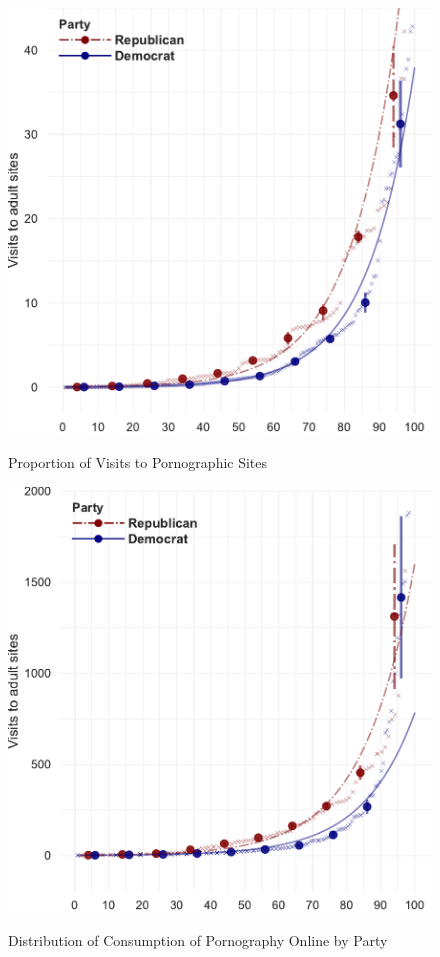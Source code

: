 \documentclass[12pt, letterpaper]{article}
\begin{document}
\begin{figure}[h]
\centering
\caption{Proportion of Visits to Pornographic Sites}
\includegraphics[scale=.75]{../figs/distribution_proportion_adultsites_visits_by_party.pdf}
\label{fig:distribution_prop_visits}
\end{figure}

\begin{figure}[h]
\centering
\caption{Distribution of Consumption of Pornography Online by Party}
\includegraphics[scale=.75]{../figs/distribution_visits_to_adultsites_by_party.pdf}
\label{fig:distribution_visits_party}
\end{figure}
\end{document}
